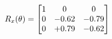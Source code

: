 \documentclass[preview]{standalone}
\begin{document}
\begin{align*}
\special{dvisvgm:raw <g id='unique000'>}R_{x}(\theta) = \begin{bmatrix}1 & 0 & 0 \\0 & -0.62 & -0.79 \\0 & +0.79 & -0.62\end{bmatrix}\special{dvisvgm:raw </g>}
\end{align*}
\end{document}
